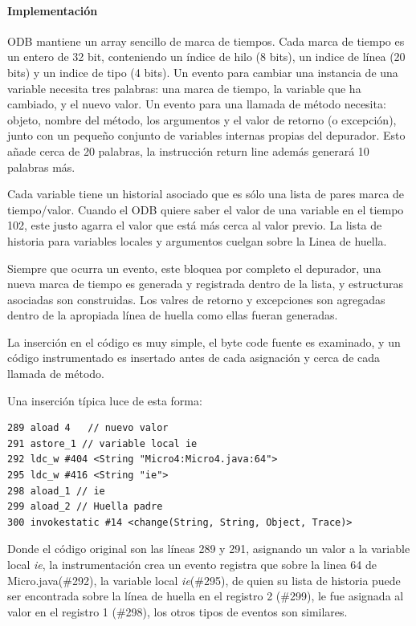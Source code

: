 \documentclass[12pt,legalpaper]{report}
\begin{document}
				\paragraph{Implementación}

ODB mantiene un array sencillo de marca de tiempos.  Cada marca de tiempo es un entero de 32 bit, conteniendo un índice de hilo (8 bits), un indice de línea (20 bits) y un indice de tipo (4 bits).  Un evento para cambiar una instancia de una variable necesita tres palabras: una marca de tiempo, la variable que ha cambiado, y el nuevo valor.  Un evento para una llamada de método necesita: objeto, nombre del método, los argumentos y el valor de retorno (o excepción), junto con un pequeño conjunto de variables internas propias del depurador.  Esto añade cerca de 20 palabras, la instrucción return line además generará 10 palabras más.

Cada variable tiene un historial asociado que es sólo una lista de pares marca de tiempo/valor. Cuando el ODB quiere saber el valor de una variable en el tiempo 102, este justo agarra el valor que está más cerca al valor previo.  La lista de historia para variables locales y argumentos cuelgan sobre la Linea de huella.

Siempre que ocurra un evento, este bloquea por completo el depurador, una nueva marca de tiempo es generada y registrada dentro de la lista, y estructuras asociadas son construidas.  Los valres de retorno y excepciones son agregadas dentro de la apropiada línea de huella como ellas fueran generadas.

La inserción en el código es muy simple, el byte code fuente es examinado, y un código instrumentado es insertado antes de cada asignación y cerca de cada llamada de método.

Una inserción típica luce de esta forma:

\begin{singlespace}
\begin{verbatim}
289 aload 4   // nuevo valor
291 astore_1 // variable local ie
292 ldc_w #404 <String "Micro4:Micro4.java:64">
295 ldc_w #416 <String "ie">
298 aload_1 // ie
299 aload_2 // Huella padre
300 invokestatic #14 <change(String, String, Object, Trace)>
\end{verbatim}
\end{singlespace}

Donde el código original son las líneas 289 y 291, asignando un valor a la variable local \textit{ie}, la instrumentación crea un evento registra que sobre la linea 64 de Micro.java(\#292), la variable local \textit{ie}(\#295), de quien su lista de historia puede ser encontrada sobre la línea de huella en el registro 2 (\#299), le fue asignada al valor en el registro 1 (\#298), los otros tipos de eventos son similares.
\end{document}
